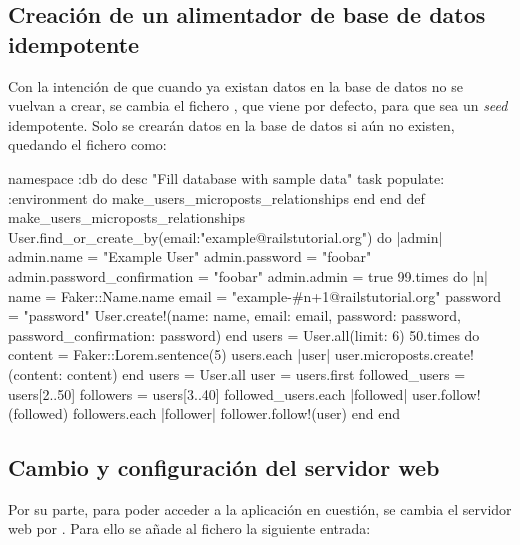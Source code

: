 
\subsection{Creación de un alimentador de base de datos idempotente}

Con la intención de que cuando ya existan datos en la base de datos no se vuelvan a crear, se cambia el fichero , que viene por defecto, para que sea un \textit{seed} idempotente. Solo se crearán datos en la base de datos si aún no existen, quedando el fichero como:

\begin{codelisting}
\label{code:idempotentseed}
\begin{code}
namespace :db do
  desc "Fill database with sample data"
  task populate: :environment do
    make_users_microposts_relationships
  end
end
def make_users_microposts_relationships
  User.find_or_create_by(email:"example@railstutorial.org") do |admin|
  	admin.name = "Example User"
	admin.password = "foobar"
        admin.password_confirmation = "foobar"
        admin.admin = true
	99.times do |n|
	    name  = Faker::Name.name
	    email = "example-#{n+1}@railstutorial.org"
	    password  = "password"
	    User.create!(name:     name,
                 email:    email,
                 password: password,
                 password_confirmation: password)
        end
	users = User.all(limit: 6)
  	50.times do
	    content = Faker::Lorem.sentence(5)
	    users.each { |user| user.microposts.create!(content: content) }
	end  
	users = User.all
	user  = users.first
	followed_users = users[2..50]
	followers      = users[3..40]
	followed_users.each { |followed| user.follow!(followed) }
	followers.each      { |follower| follower.follow!(user) }
  end
end
\end{code}
\end{codelisting}

\subsection{Cambio y configuración del servidor web}

Por su parte, para poder acceder a la aplicación en cuestión, se cambia el servidor web  por . Para ello se añade al fichero  la siguiente entrada:

